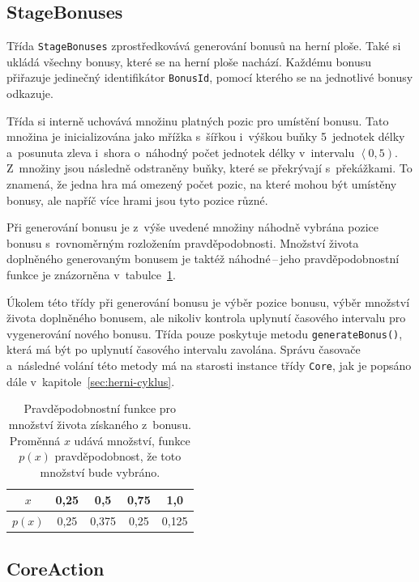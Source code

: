\subsection*{StageBonuses}

Třída \texttt{StageBonuses} zprostředkovává generování bonusů na herní ploše. Také si ukládá všechny bonusy, které se na herní ploše nachází. Každému bonusu přiřazuje jedinečný identifikátor \texttt{BonusId}, pomocí kterého se na jednotlivé bonusy odkazuje.

Třída si interně uchovává množinu platných pozic pro umístění bonusu. Tato množina je inicializována jako mřížka s~šířkou i~výškou buňky 5~jednotek délky a~posunuta zleva i~shora o~náhodný počet jednotek délky v~intervalu $\left<0,5\right)$. Z~množiny jsou následně odstraněny buňky, které se překrývají s~překážkami. To znamená, že jedna hra má omezený počet pozic, na které mohou být umístěny bonusy, ale napříč více hrami jsou tyto pozice různé.

Při generování bonusu je z~výše uvedené množiny náhodně vybrána pozice bonusu s~rovnoměrným rozložením pravděpodobnosti. Množství života doplněného generovaným bonusem je taktéž náhodné\,--\,jeho pravděpodobnostní funkce je znázorněna v~tabulce~\ref{tab:hp-recovery-prob}.

Úkolem této třídy při generování bonusu je výběr pozice bonusu, výběr množství života doplněného bonusem, ale nikoliv kontrola uplynutí časového intervalu pro vygenerování nového bonusu. Třída pouze poskytuje metodu \texttt{generateBonus()}, která má být po uplynutí časového intervalu zavolána. Správu časovače a~následné volání této metody má na starosti instance třídy \texttt{Core}, jak je popsáno dále v~kapitole~\ref{sec:herni-cyklus}.

\begin{table}[ht]
    \centering
    \begin{tabular}{|c|c|c|c|c|} \hline
        $x$    & 0{,}25 & 0{,}5   & 0{,}75 & 1{,}0   \\ \hline
        $p(x)$ & 0{,}25 & 0{,}375 & 0{,}25 & 0{,}125 \\ \hline
    \end{tabular}
    \caption{Pravděpodobnostní funkce pro množství života získaného z~bonusu. Proměnná $x$ udává množství, funkce $p(x)$ pravděpodobnost, že toto množství bude vybráno.}
    \label{tab:hp-recovery-prob}
\end{table}

\subsection*{CoreAction}

